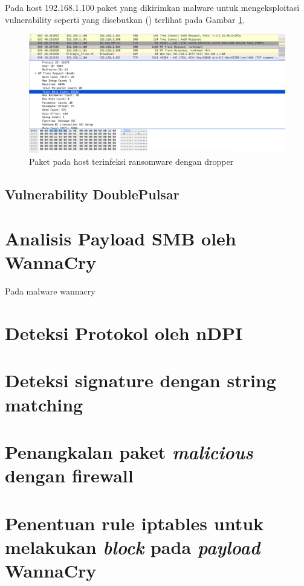 Pada host 192.168.1.100 paket yang dikirimkan malware untuk mengeksploitasi vulnerability seperti yang disebutkan (\cite{islam2018smb}) terlihat pada Gambar \ref{fig:trans_nop}.

\begin{figure}[H]
	\centering
	\includegraphics[width=\textwidth]{resources/trans_nop.png}
	\caption{Paket pada host terinfeksi ransomware dengan dropper}
	\label{fig:trans_nop}
\end{figure}


\subsection{Vulnerability DoublePulsar}

\section{Analisis Payload SMB oleh WannaCry}

Pada malware wannacry

\section{Deteksi Protokol oleh nDPI}

\section{Deteksi signature dengan string matching}


\section{Penangkalan paket \textit{malicious} dengan firewall}


\section{Penentuan rule iptables untuk melakukan \textit{block} pada \textit{payload} WannaCry}


